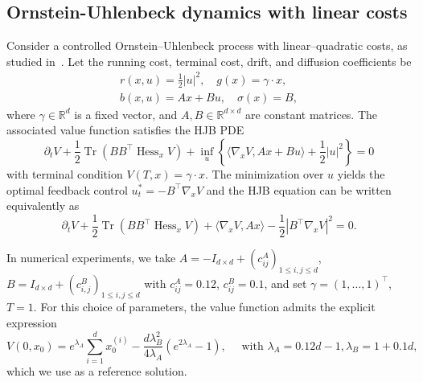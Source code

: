 \documentclass[11pt]{article}
\numberwithin{equation}{section}
\theoremstyle{plain}
\theoremstyle{definition}
\theoremstyle{remark}
\newcommand{\op}{\operatorname}
\newcommand{\R}{\mathbb{R}}
\begin{document}
\subsection{Ornstein-Uhlenbeck dynamics with linear costs}
Consider a controlled Ornstein–Uhlenbeck process with linear–quadratic costs, as studied in~\cite[Section 6.2]{nusken2021solving}. Let the running cost, terminal cost, drift, and diffusion coefficients be 
\begin{equation*}
\begin{aligned}
    r(x,u) = \frac{1}{2}|u|^2, \quad g(x) = \gamma \cdot x, \\
    b(x,u) = Ax + Bu, \quad \sigma(x) = B, 
\end{aligned}
\end{equation*}
where $\gamma \in \R^d$ is a fixed vector, and $A,B\in \R^{d\times d}$ are constant matrices. The associated value function satisfies the HJB PDE 
\begin{equation*}
    \partial_t V +\frac{1}{2}\op{Tr}(BB^\top \op{Hess}_x V) + \inf_u \left\{ \langle \nabla_x V, Ax + Bu\rangle + \frac{1}{2}|u|^2\right\} = 0 
\end{equation*}
with terminal condition $V(T, x) = \gamma \cdot x$. The minimization over $u$ yields the optimal feedback control $u^*_t = -B^\top\nabla_xV$ and the HJB equation can be written equivalently as 
\begin{equation*}
    \partial_t V +\frac{1}{2}\op{Tr}(BB^\top \op{Hess}_x V) +\langle \nabla_x V, Ax\rangle - \frac{1}{2}|B^\top \nabla_x V|^2 = 0. 
\end{equation*}

In numerical experiments, we take $A = -I_{d\times d} + (c_{ij}^A)_{1\le i,j\le d}$, $B = I_{d\times d} +(c_{i,j}^B)_{1\le i,j\le d}$ with $c_{ij}^A = 0.12$, $c_{ij}^B = 0.1$, and set $\gamma = (1,\dots,1)^\top$, $T=1$. 
For this choice of parameters, the value function admits the explicit expression 
\begin{equation*}
    V(0,x_0) = e^{\lambda_A} \sum_{i=1}^d x_0^{(i)} - \frac{d \lambda_B^2}{4 \lambda_A}(e^{2\lambda_A} - 1), \quad \text{ with } \lambda_A = 0.12d - 1 , \lambda_B = 1+0.1d, 
\end{equation*}
which we use as a reference solution. 
\end{document}
